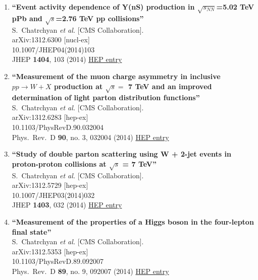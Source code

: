 \documentclass{article}
\begin{document}
\begin{enumerate}
\item%
{\bf ``Event activity dependence of Y(nS) production in $\sqrt{s_{NN}}$=5.02 TeV pPb and $\sqrt{s}$=2.76 TeV pp collisions''}
  \\{}S.~Chatrchyan {\it et al.} [CMS Collaboration].
  \\{}arXiv:1312.6300 [nucl-ex]
    \\{}10.1007/JHEP04(2014)103
\\{}JHEP {\bf 1404}, 103 (2014) %
\href{http://inspirehep.net/record/1273571}{HEP entry}


\item%
{\bf ``Measurement of the muon charge asymmetry in inclusive $pp \to W+X$ production at $\sqrt s =$ 7 TeV and an improved determination of light parton distribution functions''}
  \\{}S.~Chatrchyan {\it et al.} [CMS Collaboration].
  \\{}arXiv:1312.6283 [hep-ex]
    \\{}10.1103/PhysRevD.90.032004
\\{}Phys.\ Rev.\ D {\bf 90}, no. 3, 032004 (2014) %
\href{http://inspirehep.net/record/1273570}{HEP entry}


\item%
{\bf ``Study of double parton scattering using W + 2-jet events in proton-proton collisions at $\sqrt{s}$ = 7 TeV''}
  \\{}S.~Chatrchyan {\it et al.} [CMS Collaboration].
  \\{}arXiv:1312.5729 [hep-ex]
    \\{}10.1007/JHEP03(2014)032
\\{}JHEP {\bf 1403}, 032 (2014) %
\href{http://inspirehep.net/record/1272853}{HEP entry}


\item%
{\bf ``Measurement of the properties of a Higgs boson in the four-lepton final state''}
  \\{}S.~Chatrchyan {\it et al.} [CMS Collaboration].
  \\{}arXiv:1312.5353 [hep-ex]
    \\{}10.1103/PhysRevD.89.092007
\\{}Phys.\ Rev.\ D {\bf 89}, no. 9, 092007 (2014) %
\href{http://inspirehep.net/record/1272842}{HEP entry}



\end{enumerate}
\end{document}

